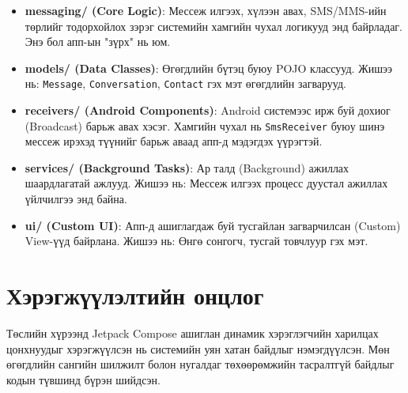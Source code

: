 \begin{itemize}
    \item \textbf{messaging/ (Core Logic)}: Мессеж илгээх, хүлээн авах, SMS/MMS-ийн төрлийг тодорхойлох зэрэг системийн хамгийн чухал логикууд энд байрладаг. Энэ бол апп-ын "зүрх" нь юм.

    \item \textbf{models/ (Data Classes)}: Өгөгдлийн бүтэц буюу POJO классууд. Жишээ нь: \texttt{Message}, \texttt{Conversation}, \texttt{Contact} гэх мэт өгөгдлийн загварууд.

    \item \textbf{receivers/ (Android Components)}: Android системээс ирж буй дохиог (Broadcast) барьж авах хэсэг. Хамгийн чухал нь \texttt{SmsReceiver} буюу шинэ мессеж ирэхэд түүнийг барьж аваад апп-д мэдэгдэх үүрэгтэй.

    \item \textbf{services/ (Background Tasks)}: Ар талд (Background) ажиллах шаардлагатай ажлууд. Жишээ нь: Мессеж илгээх процесс дуустал ажиллах үйлчилгээ энд байна.

    \item \textbf{ui/ (Custom UI)}: Апп-д ашиглагдаж буй тусгайлан загварчилсан (Custom) View-үүд байрлана. Жишээ нь: Өнгө сонгогч, тусгай товчлуур гэх мэт.
\end{itemize}
\section{Хэрэгжүүлэлтийн онцлог}
Төслийн хүрээнд Jetpack Compose \cite{jetpack_compose} ашиглан динамик хэрэглэгчийн харилцах цонхнуудыг хэрэгжүүлсэн нь системийн уян хатан байдлыг нэмэгдүүлсэн. Мөн өгөгдлийн сангийн шилжилт болон нугалдаг төхөөрөмжийн тасралтгүй байдлыг кодын түвшинд бүрэн шийдсэн.
